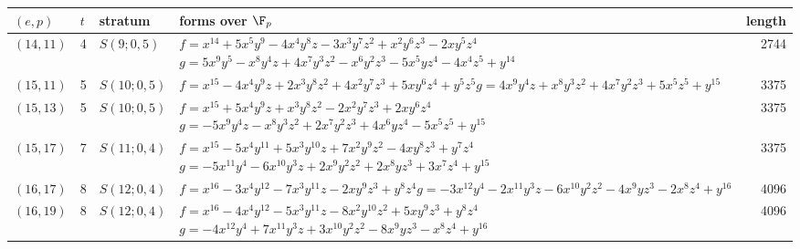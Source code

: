 \begin{tabular}{@{}lll>{\raggedright\arraybackslash}p{9.6cm}r@{}}
\toprule
$(e,p)$ & $t$ & stratum & forms over $\F_p$ & length\\
\midrule
$(14,11)$ & 4 & $S(9;0,5)$ & $f=x^{14} + 5x^{5}y^{9} - 4x^{4}y^{8}z - 3x^{3}y^{7}z^{2} + x^{2}y^{6}z^{3} - 2xy^{5}z^{4}$\newline $g=5x^{9}y^{5} - x^{8}y^{4}z + 4x^{7}y^{3}z^{2} - x^{6}y^{2}z^{3} - 5x^{5}yz^{4} - 4x^{4}z^{5} + y^{14}$ & 2744\\
$(15,11)$ & 5 & $S(10;0,5)$ & $f=x^{15} - 4x^{4}y^{9}z + 2x^{3}y^{8}z^{2} + 4x^{2}y^{7}z^{3} + 5xy^{6}z^{4} + y^{5}z^{5}$\newline $g=4x^{9}y^{4}z + x^{8}y^{3}z^{2} + 4x^{7}y^{2}z^{3} + 5x^{5}z^{5} + y^{15}$ & 3375\\
$(15,13)$ & 5 & $S(10;0,5)$ & $f=x^{15} + 5x^{4}y^{9}z + x^{3}y^{8}z^{2} - 2x^{2}y^{7}z^{3} + 2xy^{6}z^{4}$\newline $g=-5x^{9}y^{4}z - x^{8}y^{3}z^{2} + 2x^{7}y^{2}z^{3} + 4x^{6}yz^{4} - 5x^{5}z^{5} + y^{15}$ & 3375\\
$(15,17)$ & 7 & $S(11;0,4)$ & $f=x^{15} - 5x^{4}y^{11} + 5x^{3}y^{10}z + 7x^{2}y^{9}z^{2} - 4xy^{8}z^{3} + y^{7}z^{4}$\newline $g=-5x^{11}y^{4} - 6x^{10}y^{3}z + 2x^{9}y^{2}z^{2} + 2x^{8}yz^{3} + 3x^{7}z^{4} + y^{15}$ & 3375\\
$(16,17)$ & 8 & $S(12;0,4)$ & $f=x^{16} - 3x^{4}y^{12} - 7x^{3}y^{11}z - 2xy^{9}z^{3} + y^{8}z^{4}$\newline $g=-3x^{12}y^{4} - 2x^{11}y^{3}z - 6x^{10}y^{2}z^{2} - 4x^{9}yz^{3} - 2x^{8}z^{4} + y^{16}$ & 4096\\
$(16,19)$ & 8 & $S(12;0,4)$ & $f=x^{16} - 4x^{4}y^{12} - 5x^{3}y^{11}z - 8x^{2}y^{10}z^{2} + 5xy^{9}z^{3} + y^{8}z^{4}$\newline $g=-4x^{12}y^{4} + 7x^{11}y^{3}z + 3x^{10}y^{2}z^{2} - 8x^{9}yz^{3} - x^{8}z^{4} + y^{16}$ & 4096\\
\bottomrule
\end{tabular}
